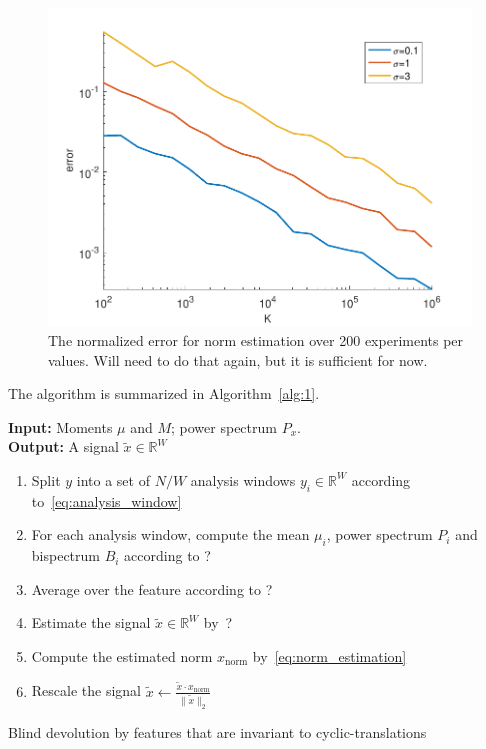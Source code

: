 \documentclass[journal]{IEEEtran}
\numberwithin{equation}{section}
\numberwithin{figure}{section}
\theoremstyle{plain}
\theoremstyle{definition}
\theoremstyle{remark}
\theoremstyle{plain}
\theoremstyle{remark}
\theoremstyle{plain}
\theoremstyle{plain}
\begin{document}
\begin{figure}
	\begin{center}
		\includegraphics[scale = .5]{NormError}		
	\end{center}
	\caption{The normalized error for norm estimation over 200 experiments per values. Will need to do that again, but it is sufficient for now.}
	\label{fig:norn_error}
\end{figure}

The algorithm is summarized in Algorithm~\ref{alg:1}.



\begin{algorithm}[h]
		\textbf{Input:} Moments $\mu$ and $M$; power spectrum $P_x$. \\ 
		\textbf{Output:} A signal $\tilde x\in\mathbb{R}^W$  \\ 
		\begin{enumerate}
			\item Split $y$ into a set of $N/W$ analysis windows $y_i\in\mathbb{R}^W$ according to~\eqref{eq:analysis_window}
			\item  For each analysis window, compute the mean $\mu_i$, power spectrum $P_i$ and bispectrum $B_i$ according to ?
			\item  Average over the feature according to ?
			\item  Estimate the signal $\tilde{x}\in\mathbb{R}^W$ by~?
			\item  Compute the estimated norm $x_{\textrm{norm}}$  by~\eqref{eq:norm_estimation}
			\item  Rescale the signal $\tilde x \gets \frac{\tilde{x}\cdot x_{\textrm{norm}}}{\|\tilde{x}\|_2} $    
		\end{enumerate}
	\caption{Blind devolution by features that are invariant to cyclic-translations} 	\label{alg:1}
\end{algorithm}
\end{document}
